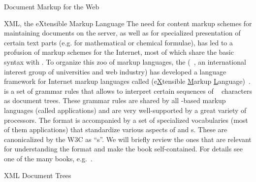 \begin{omgroup}[id=markup-web]{Document Markup for the Web}
\begin{omgroup}[id=xml]{XML, the eXtensible Markup Language}
  The need for content markup schemes for maintaining documents on the server, as well as
  for specialized presentation of certain text parts (e.g. for mathematical or chemical
  formulae), has led to a profusion of markup schemes for the Internet, most of which
  share the basic {\sgml} syntax with {\html}.  To organize this zoo of markup languages,
  the {} ({}~\cite{URL:w3c}, an
  international interest group of universities and web industry) has developed a language
  framework for Internet markup languages called {\xml} (e{\underline{X}}tensible
  {\underline{M}}arkup {\underline{L}}anguage)~\cite{Bray:XML97}. {\xml} is a set of
  grammar rules that allows to interpret certain sequences of
  {}~\cite{Unicode:tuc03} characters as document trees. These grammar
  rules are shared by all {\xml}-based markup languages (called {\xml}
  applications) and are very well-supported by a great
  variety of {\xml} processors. The {\xml} format is
  accompanied by a set of specialized vocabularies (most of them {\xml} applications) that
  standardize various aspects of {} and
  {s}. These are canonicalized by the W3C as
  ``{s}''. We will briefly review the ones that are relevant for
  understanding the {\omdoc} format and make the book self-contained. For details see one
  of the many {\xml} books, e.g.~\cite{Harold:xb01}.

\begin{omgroup}[id=xml-tree]{XML Document Trees}


\end{omgroup}
\end{omgroup}
\end{omgroup}
